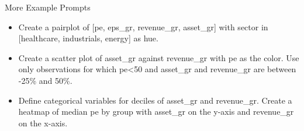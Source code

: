 \documentclass[10pt]{beamer}
\begin{document}
\begin{frame}{More Example Prompts}
  \begin{itemize}
    
  \item Create a pairplot of [pe, eps\_gr, revenue\_gr, asset\_gr] with sector in [healthcare, industrials, energy] as hue.
  \item Create a scatter plot of asset\_gr against revenue\_gr with pe as the color.  Use only observations for which pe<50 and asset\_gr and revenue\_gr are between -25\% and 50\%.
  \item Define categorical variables for deciles of asset\_gr and revenue\_gr.  Create a heatmap of median pe by group with asset\_gr on the y-axis and revenue\_gr on the x-axis.
  \end{itemize}
\end{frame}
\end{document}
